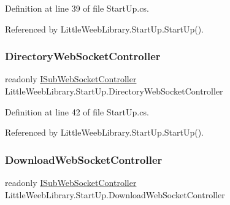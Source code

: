 Definition at line 39 of file Start\+Up.\+cs.



Referenced by Little\+Weeb\+Library.\+Start\+Up.\+Start\+Up().

\mbox{\label{class_little_weeb_library_1_1_start_up_a7d9287cfe0c87dd727af3e0932905870}} 
\subsubsection{\texorpdfstring{Directory\+Web\+Socket\+Controller}{DirectoryWebSocketController}}
{\footnotesize\ttfamily readonly \mbox{\hyperlink{interface_little_weeb_library_1_1_controllers_1_1_i_sub_web_socket_controller}{I\+Sub\+Web\+Socket\+Controller}} Little\+Weeb\+Library.\+Start\+Up.\+Directory\+Web\+Socket\+Controller\hspace{0.3cm}{\ttfamily [private]}}



Definition at line 42 of file Start\+Up.\+cs.



Referenced by Little\+Weeb\+Library.\+Start\+Up.\+Start\+Up().

\mbox{\label{class_little_weeb_library_1_1_start_up_ad5421fcdf8aae805b8331bd0e9034f39}} 
\subsubsection{\texorpdfstring{Download\+Web\+Socket\+Controller}{DownloadWebSocketController}}
{\footnotesize\ttfamily readonly \mbox{\hyperlink{interface_little_weeb_library_1_1_controllers_1_1_i_sub_web_socket_controller}{I\+Sub\+Web\+Socket\+Controller}} Little\+Weeb\+Library.\+Start\+Up.\+Download\+Web\+Socket\+Controller\hspace{0.3cm}{\ttfamily [private]}}



